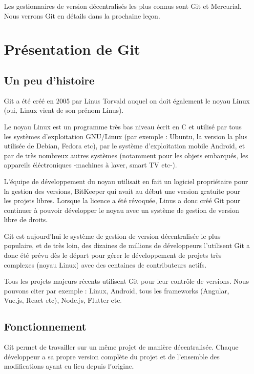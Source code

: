 \documentclass{article}
\begin{document}
Les gestionnaires de version décentralisés les plus connus sont {\color{blue} Git} et {\color{blue} Mercurial}. Nous verrons Git en détails dans la prochaine leçon.

\section{Présentation de Git}
\subsection{Un peu d'histoire}
{\color{blue}Git} a été créé en 2005 par {\color{blue}Linus Torvald} auquel on doit également le noyau {\color{blue}Linux} (oui, {\color{blue}Linux} vient de son prénom {\color{blue}Linus}).

Le noyau {\color{blue}Linux} est un programme très bas niveau écrit en {\color{blue}C} et utilisé par tous les systèmes d'exploitation {\color{blue}GNU/Linux} (par exemple : {\color{blue}Ubuntu}, la version la plus utilisée de {\color{blue}Debian}, {\color{blue}Fedora} etc), par le système d'exploitation mobile {\color{blue}Android}, et par de très nombreux autres systèmes (notamment pour les objets embarqués, les appareils éléctroniques -machines à laver, smart TV etc-).

L'équipe de développement du noyau utilisait en fait un logiciel propriétaire pour la gestion des versions, {\color{blue}BitKeeper} qui avait au début une version gratuite pour les projets libres. Lorsque la licence a été révoquée, {\color{blue}Linus} a donc créé {\color{blue}Git} pour continuer à pouvoir développer le noyau avec un système de gestion de version libre de droits.

{\color{blue}Git} est aujourd'hui le système de gestion de version décentralisée le plus populaire, et de très loin, des dizaines de millions de développeurs l'utilisent {\color{blue}Git} a donc été prévu dès le départ pour gérer le développement de projets très complexes (noyau {\color{blue}Linux}) avec des centaines de contributeurs actifs.

Tous les projets majeurs récents utilisent {\color{blue}Git} pour leur contrôle de versions. Nous pouvons citer par exemple : {\color{blue}Linux}, {\color{blue}Android}, tous les frameworks ({\color{blue}Angular}, {\color{blue}Vue.js}, {\color{blue}React} etc), {\color{blue}Node.js}, {\color{blue}Flutter} etc.

\subsection{Fonctionnement}
{\color{blue}Git} permet de travailler sur un même projet de manière décentralisée. Chaque développeur a sa propre version complète du projet et de l'ensemble des modifications ayant eu lieu depuis l'origine.
\end{document}
